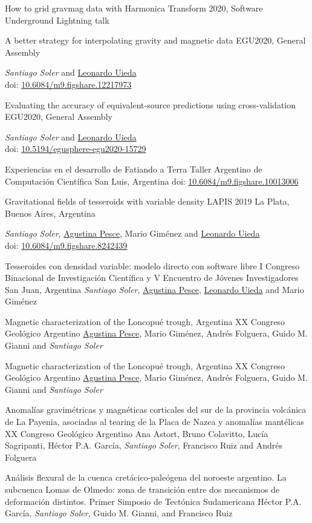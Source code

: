 \documentclass[a4paper,12pt,sans,colorlinks]{moderncv/moderncv}
\newcommand{\me}{\emph{Santiago Soler}}
\newcommand{\agustina}{\href{https://aguspesce.github.io}{Agustina Pesce}}
\newcommand{\guido}{Guido M. Gianni}
\newcommand{\leo}{\href{https://www.leouieda.com}{Leonardo Uieda}}
\newcommand{\mario}{Mario Giménez}
\newcommand{\folguera}{Andrés Folguera}
\newcommand{\pichu}{Héctor P.A. García}
\newcommand{\paco}{Francisco Ruiz}
\newcommand{\doi}[1]{
    \href{https://doi.org/#1}{#1}
}
\begin{document}
{How to grid gravmag data with Harmonica}
{Transform 2020, Software Underground}
{}
{Lightning talk}
{}

{A better strategy for interpolating gravity and magnetic data}
{EGU2020, General Assembly}
{}
{}
{
    \me{} and \leo{}
    \\
    doi: \doi{10.6084/m9.figshare.12217973}
}

{
    Evaluating the accuracy of equivalent-source predictions using
    cross-validation
}
{EGU2020, General Assembly}
{}
{}
{
    \me{} and \leo{}
    \\
    doi: \doi{10.5194/egusphere-egu2020-15729}
}

{Experiencias en el desarrollo de Fatiando a Terra}
{Taller Argentino de Computación Científica}
{San Luis, Argentina}
{}
{doi: \doi{10.6084/m9.figshare.10013006}}

{Gravitational fields of tesseroids with variable density}
{LAPIS 2019}
{La Plata, Buenos Aires, Argentina}
{}
{
    \me{}, \agustina{}, \mario{} and \leo{}
    \\
    doi: \doi{10.6084/m9.figshare.8242439}
}

{Tesseroides con densidad variable: modelo directo con software libre}
{
    I Congreso Binacional de Investigación Científica y V Encuentro de Jóvenes
    Investigadores
}
{San Juan, Argentina}
{}
{\me{}, \agustina{}, \leo{} and \mario{}}

{Magnetic characterization of the Loncopué trough, Argentina}
{XX Congreso Geológico Argentino}
{}
{}
{\agustina{}, \mario{}, \folguera{}, \guido{} and \me{}}

{Magnetic characterization of the Loncopué trough, Argentina}
{XX Congreso Geológico Argentino}
{}
{}
{\agustina{}, \mario{}, \folguera{}, \guido{} and \me{}}

{
    Anomalías gravimétricas y magnéticas corticales del sur de la provincia
    volcánica de La Payenia, asociadas al tearing de la Placa de Nazca
    y anomalías mantélicas
}
{XX Congreso Geológico Argentino}
{}
{}
{
    Ana Astort, Bruno Colavitto, Lucía Sagripanti, \pichu{}, \me{}, \paco{}
    and \folguera{}
}

{
   Análisis flexural de la cuenca cretácico-paleógena del noroeste
   argentino. La subcuenca Lomas de Olmedo: zona de transición entre dos
   mecanismos de deformación distintos.
}
{Primer Simposio de Tectónica Sudamericana}
{}
{}
{\pichu{}, \me{}, \guido{}, and \paco{}}
\end{document}
